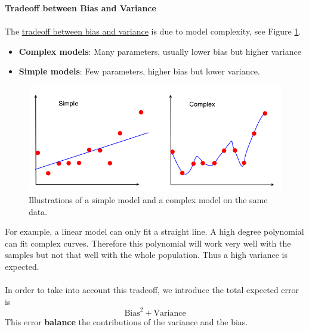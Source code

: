 \textbf{Tradeoff between Bias and Variance}
\\\\
The \href{http://scott.fortmann-roe.com/docs/BiasVariance.html}{tradeoff between bias and variance} is due to model complexity, see Figure \ref{fig:simple_complex}.
\begin{itemize}
 \item \textbf{Complex models}: Many parameters, usually lower bias but higher variance
 \item \textbf{Simple models}: Few parameters, higher bias but lower variance.
\end{itemize}
\begin{figure}[H] %
\centerline{
\includegraphics[width=13cm]{img/07/simple_complex}
}
\caption{\label{fig:simple_complex} 
Illustrations of a simple model and a complex model on the same data.
}
\end{figure}


For example, a linear model can only fit a straight line. A high degree polynomial can fit complex curves. Therefore this polynomial will work very well with the samples but not that well with the whole population. Thus a high variance is expected.
\\\\
In order to take into account this tradeoff, we introduce the total expected error is 
\[
 \textrm{Bias}^2 + \textrm{Variance}
\]
This error {\bf balance} the contributions of the variance and the bias. 

